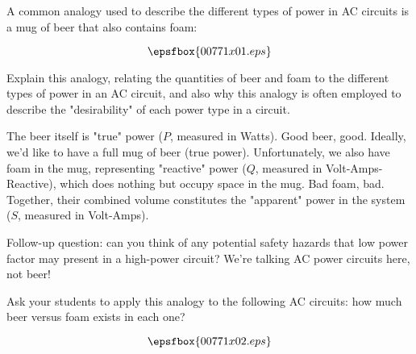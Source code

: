 

A common analogy used to describe the different types of power in AC circuits is a mug of beer that also contains foam:

$$\epsfbox{00771x01.eps}$$

Explain this analogy, relating the quantities of beer and foam to the different types of power in an AC circuit, and also why this analogy is often employed to describe the "desirability" of each power type in a circuit.







The beer itself is "true" power ($P$, measured in Watts).  Good beer, good.  Ideally, we'd like to have a full mug of beer (true power).  Unfortunately, we also have foam in the mug, representing "reactive" power ($Q$, measured in Volt-Amps-Reactive), which does nothing but occupy space in the mug.  Bad foam, bad.  Together, their combined volume constitutes the "apparent" power in the system ($S$, measured in Volt-Amps).

\vskip 10pt

Follow-up question: can you think of any potential safety hazards that low power factor may present in a high-power circuit?  We're talking AC power circuits here, not beer!







Ask your students to apply this analogy to the following AC circuits: how much beer versus foam exists in each one?

$$\epsfbox{00771x02.eps}$$




